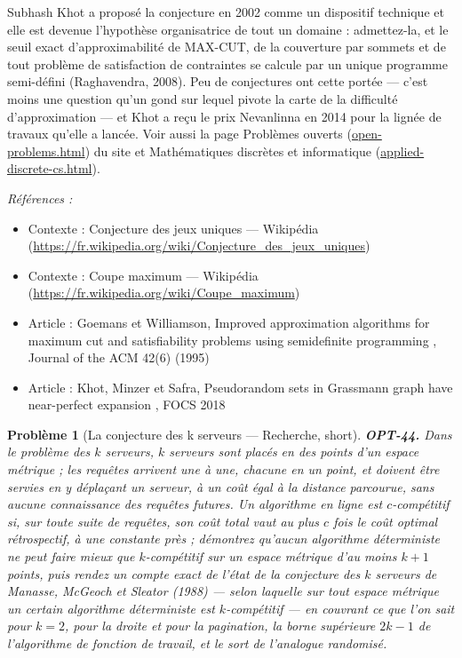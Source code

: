 \documentclass[11pt]{article}
\newtheorem{problem}{Problème}
\newenvironment{refs}{\par\small\noindent\emph{Références :}\begin{itemize}\setlength\itemsep{0pt}}{\end{itemize}\normalsize}
\begin{document}
\noindent Subhash Khot a proposé la conjecture en 2002 comme un dispositif technique et
elle est devenue l'hypothèse organisatrice de tout un domaine : admettez-la, et le seuil exact
d'approximabilité de MAX-CUT, de la couverture par sommets et de tout problème de satisfaction de
contraintes se calcule par un unique programme semi-défini (Raghavendra, 2008). Peu de conjectures
ont cette portée --- c'est moins une question qu'un gond sur lequel pivote la carte de la difficulté
d'approximation --- et Khot a reçu le prix Nevanlinna en 2014 pour la lignée de travaux qu'elle a
lancée. Voir aussi la page
Problèmes ouverts (\url{open-problems.html}) du site et
Mathématiques discrètes et informatique (\url{applied-discrete-cs.html}).

\begin{refs}
\item Contexte : Conjecture des jeux uniques --- Wikipédia (\url{https://fr.wikipedia.org/wiki/Conjecture_des_jeux_uniques})
\item Contexte : Coupe maximum --- Wikipédia (\url{https://fr.wikipedia.org/wiki/Coupe_maximum})
\item Article : Goemans et Williamson, \og{} Improved approximation algorithms for maximum cut and satisfiability problems using semidefinite programming \fg{}, Journal of the ACM 42(6) (1995)
\item Article : Khot, Minzer et Safra, \og{} Pseudorandom sets in Grassmann graph have near-perfect expansion \fg{}, FOCS 2018
\end{refs}

\bigskip

\begin{problem}[{La conjecture des k serveurs --- Recherche, short}]
\textbf{OPT-44.} Dans le problème des $k$ serveurs, $k$ serveurs sont placés en des points d'un espace métrique ; les requêtes arrivent une à une, chacune en un point, et doivent être servies en y déplaçant un serveur, à un coût égal à la distance parcourue, sans aucune connaissance des requêtes futures. Un algorithme en ligne est \textit{$c$-compétitif} si, sur toute suite de requêtes, son coût total vaut au plus $c$ fois le coût optimal rétrospectif, à une constante près ; démontrez qu'aucun algorithme déterministe ne peut faire mieux que $k$-compétitif sur un espace métrique d'au moins $k+1$ points, puis rendez un compte exact de l'état de la conjecture des $k$ serveurs de Manasse, McGeoch et Sleator (1988) --- selon laquelle sur tout espace métrique un certain algorithme déterministe est $k$-compétitif --- en couvrant ce que l'on sait pour $k = 2$, pour la droite et pour la pagination, la borne supérieure $2k-1$ de l'algorithme de fonction de travail, et le sort de l'analogue randomisé.
\end{problem}
\end{document}
